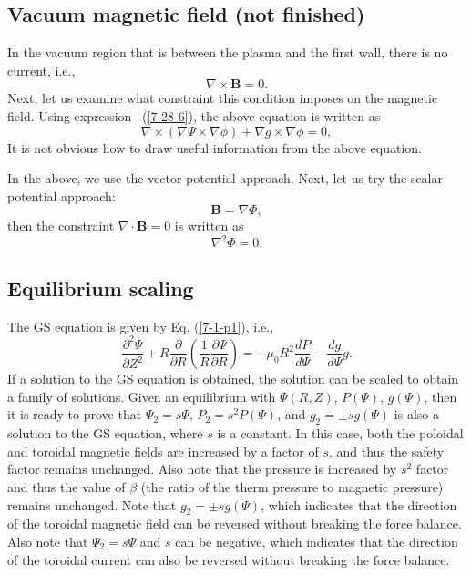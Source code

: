 \documentclass{llncs}
\begin{document}
\subsection{Vacuum magnetic field (not finished)}

In the vacuum region that is between the plasma and the first wall, there is
no current, i.e.,
\begin{equation}
  \nabla \times \mathbf{B}= 0.
\end{equation}
Next, let us examine what constraint this condition imposes on the magnetic
field. Using expression \ (\ref{7-28-6}), the above equation is written as
\begin{equation}
  \nabla \times (\nabla \Psi \times \nabla \phi) + \nabla g \times \nabla \phi
  = 0,
\end{equation}
It is not obvious how to draw useful information from the above equation.

In the above, we use the vector potential approach. Next, let us try the
scalar potential approach:
\begin{equation}
  \mathbf{B}= \nabla \Phi,
\end{equation}
then the constraint $\nabla \cdot \mathbf{B}= 0$ is written as
\begin{equation}
  \nabla^2 \Phi = 0.
\end{equation}


\subsection{Equilibrium scaling}

The GS equation is given by Eq. (\ref{7-1-p1}), i.e.,
\begin{equation}
  \label{23-1-17-p1} \frac{\partial^2 \Psi}{\partial Z^2} + R
  \frac{\partial}{\partial R} \left( \frac{1}{R} \frac{\partial \Psi}{\partial
  R} \right) = - \mu_0 R^2 \frac{d P}{d \Psi} - \frac{d g}{d \Psi} g.
\end{equation}
If a solution to the GS equation is obtained, the solution can be scaled to
obtain a family of solutions. Given an equilibrium with $\Psi (R, Z)$, $P
(\Psi)$, $g (\Psi)$, then it is ready to prove that $\Psi_2 = s \Psi$, $P_2 =
s^2 P (\Psi)$, and $g_2 = \pm s g (\Psi)$ is also a solution to the GS
equation, where $s$ is a constant. In this case, both the poloidal and
toroidal magnetic fields are increased by a factor of $s$, and thus the safety
factor remains unchanged. Also note that the pressure is increased by $s^2$
factor and thus the value of $\beta$ (the ratio of the therm pressure to
magnetic pressure) remains unchanged. Note that $g_2 = \pm s g (\Psi)$, which
indicates that the direction of the toroidal magnetic field can be reversed
without breaking the force balance. Also note that $\Psi_2 = s \Psi$ and $s$
can be negative, which indicates that the direction of the toroidal current
can also be reversed without breaking the force balance.
\end{document}
